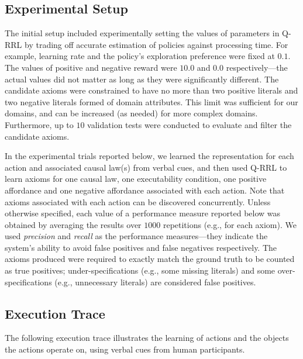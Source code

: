 \documentclass{article}
\begin{document}
\subsection{Experimental Setup}
\label{sec:exp-setup}
The initial setup included experimentally setting the values of
parameters in Q-RRL by trading off accurate estimation of policies
against processing time. For example, learning rate and the policy's
exploration preference were fixed at $0.1$. The values of positive and
negative reward were $10.0$ and $0.0$ respectively---the actual values
did not matter as long as they were significantly different. The
candidate axioms were constrained to have no more than two positive
literals and two negative literals formed of domain attributes. This
limit was sufficient for our domains, and can be increased (as needed)
for more complex domains.  Furthermore, up to $10$ validation tests
were conducted to evaluate and filter the candidate axioms.

In the experimental trials reported below, we learned the
representation for each action and associated causal law(s) from
verbal cues, and then used Q-RRL to learn axioms for one causal law,
one executability condition, one positive affordance and one negative
affordance associated with each action. Note that axioms associated
with each action can be discovered concurrently. Unless otherwise
specified, each value of a performance measure reported below was
obtained by averaging the results over $1000$ repetitions (e.g., for
each axiom).  We used \textit{precision} and \textit{recall} as the
performance measures---they indicate the system's ability to avoid
false positives and false negatives respectively.  The axioms produced
were required to exactly match the ground truth to be counted as true
positives; under-specifications (e.g., some missing literals) and some
over-specifications (e.g., unnecessary literals) are considered false
positives.


\subsection{Execution Trace}
\label{sec:exp-traces}
The following execution trace illustrates the learning of actions and
the objects the actions operate on, using verbal cues from human
participants.
\end{document}
